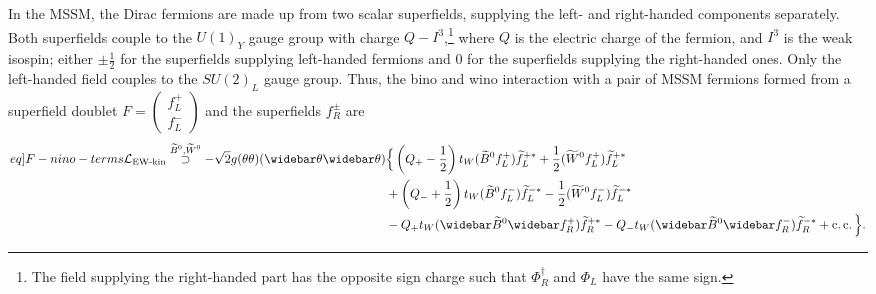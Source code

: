 \documentclass[english, notitlepage]{article}
\begin{document}
            In the MSSM, the Dirac fermions are made up from two scalar superfields,
            supplying the left- and right-handed components separately. Both superfields
            couple to the ${U(1)}_Y$ gauge group with charge $Q-I^3$,\footnote{The field
                supplying the right-handed part has the opposite sign charge such that
                $\Phi^\dag_R$ and $\Phi_L$ have the same sign.} where $Q$ is the electric
            charge of the fermion, and $I^3$ is the weak isospin; either $\pm \frac{1}{2}$
            for the superfields supplying left-handed fermions and 0 for the superfields
            supplying the right-handed ones. Only the left-handed field couples to the
            ${SU(2)}_L$ gauge group. Thus, the bino and wino interaction with a pair of
            MSSM fermions formed from a superfield doublet $F = \begin{pmatrix} f_L^+ \\ f_L^- \end{pmatrix}$ and the superfields $f_R^\pm$ are
            \begin{align}
                \label[eq]{F-nino-terms}
                \nonumber
                \L_{\text{EW-kin}} \stackrel{\bino, \wino}{\supset} -\sqrt{2} g (\theta\theta)(\wbar\theta\wbar\theta) & \Big\{ \pclosed{Q_+-\frac{1}{2}}t_W (\bino f_L^+) \wtilde{f}_L^{+*} + \frac{1}{2} (\wino f_L^+) \wtilde{f}_L^{+*}                     \\ \nonumber
                                                                                                                       & + \pclosed{Q_-+\frac{1}{2}}t_W (\bino f_L^-)\wtilde{f}_L^{-*} - \frac{1}{2} (\wino f_L^-)\wtilde{f}_L^{-*}                            \\
                                                                                                                       & - Q_+t_W (\wbar{\wtilde{B}}^0\wbar{f}_R^+)\wtilde{f}_R^{+*} - Q_-t_W (\wbar{\wtilde{B}}^0\wbar{f}_R^-)\wtilde{f}_R^{-*} + \cc \Big\}.
            \end{align}
\end{document}

